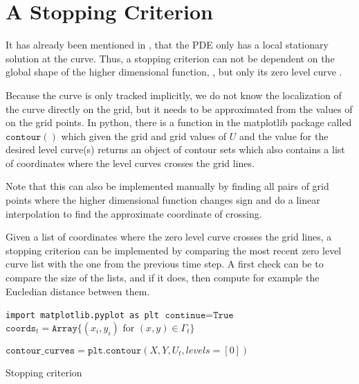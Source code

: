 \section{A Stopping Criterion}
It has already been mentioned in , that the PDE only has a local stationary solution at the curve. Thus, a stopping criterion can not be dependent on the global shape of the higher dimensional function, \uxt, but only its zero level curve \curve. 

Because the curve is only tracked implicitly, we do not know the localization of the curve directly on the grid, but it needs to be approximated from the values of \uxt on the grid points. In python, there is a function in the matplotlib package called $\texttt{contour}()$ which given the grid and grid values of $U$ and the value for the desired level curve(s) returns an object of contour sets which also contains a list of coordinates where the level curves crosses the grid lines.

Note that this can also be implemented manually by finding all pairs of grid points where the higher dimensional function changes sign and do a linear interpolation to find the approximate coordinate of crossing. 

Given a list of coordinates where the zero level curve crosses the grid lines, a stopping criterion can be implemented by comparing the most recent zero level curve list with the one from the previous time step. A first check can be to compare the size of the lists, and if it does, then compute for example the Eucledian distance between them. 

\begin{algorithm}[H]
\SetAlgoLined
\texttt{import matplotlib.pyplot as plt} \;
$\texttt{continue} = \texttt{True}$ \;
$\texttt{coords}_t = \texttt{Array} \{(x_i, y_i) \text{ for } (x, y)\in \Gamma_t \}$ \;



$\texttt{contour\_curves} = \texttt{plt.contour}(X, Y, U_t, levels=[0])$ \;

 \caption{Stopping criterion}
\label{alg:stopping-criterion}
\end{algorithm}

\clearpage
